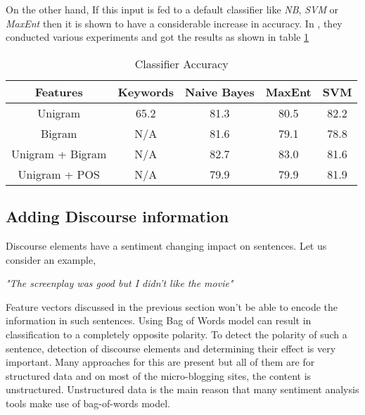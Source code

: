 On the other hand, If this input is fed to a default classifier like \textit{NB}, \textit{SVM} or \textit{MaxEnt} then it is shown to have a considerable increase
in accuracy\citep*{go2009twitter}. In \citep*{go2009twitter}, they conducted various experiments and got the results as shown in table
\ref{table:classifierAccuracy}

\begin{table}
 \caption{Classifier Accuracy}
 \begin{center}
 \begin{tabular}{| c | c | c | c | c | }
  \hline
  Features 		& Keywords & Naive Bayes & MaxEnt & SVM \\ \hline
  Unigram  		& 65.2 & 81.3 & 80.5 & 82.2 \\ \hline
  Bigram 		& N/A & 81.6 & 79.1 &78.8 \\ \hline
  Unigram + Bigram 	& N/A & 82.7 & 83.0 & 81.6 \\ \hline
  Unigram + POS 	& N/A & 79.9 & 79.9 & 81.9 \\
  \hline
 \end{tabular}
 \end{center}
 \label{table:classifierAccuracy}
\end{table}

\subsection{Adding Discourse information}

\par
Discourse elements have a sentiment changing impact on sentences. Let us consider an example,

\begin{center} \textit{"The screenplay was good but I didn't like the movie"}\end{center}

\par
Feature vectors discussed in the previous section won't be able to encode the information in such sentences. Using Bag of Words 
model can result in classification to a completely opposite polarity. To detect the polarity of such a sentence, detection of 
discourse elements and determining their effect is very important. Many approaches for this are present but all of them are for 
structured data and on most of the micro-blogging sites, the content is unstructured. Unstructured data is the main reason that 
many sentiment analysis tools make use of bag-of-words model. 


